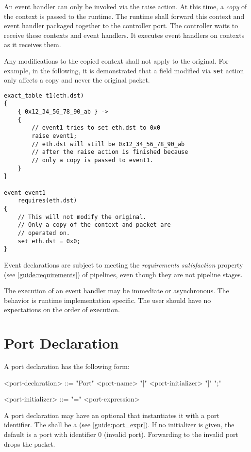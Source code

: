 An event handler can only be invoked via the raise action. At this time, a \textit{copy} of the context is passed to the runtime. The runtime shall forward this context and event handler packaged together to the controller port. The controller waits to receive these contexts and event handlers. It executes event handlers on contexts as it receives them.

Any modifications to the copied context shall not apply to the original. For example, in the following, it is demonstrated that a field modified via \texttt{set} action only affects a copy and never the original packet.

\begin{minip}
\begin{lstlisting}
exact_table t1(eth.dst)
{
	{ 0x12_34_56_78_90_ab } ->
	{
		// event1 tries to set eth.dst to 0x0
		raise event1;
		// eth.dst will still be 0x12_34_56_78_90_ab
		// after the raise action is finished because
		// only a copy is passed to event1.
	}
}

event event1
	requires(eth.dst)
{
	// This will not modify the original.
	// Only a copy of the context and packet are
	// operated on.
	set eth.dst = 0x0;
}
\end{lstlisting}
\end{minip}

Event declarations are subject to meeting the \textit{requirements satisfaction} property (see \ref{guide:requirements}) of pipelines, even though they are not pipeline stages.

The execution of an event handler may be immediate or asynchronous. The behavior is runtime implementation specific. The user should have no expectations on the order of execution. 

\section{Port Declaration} \label{guide:port}

A port declaration has the following form:

\begin{minip}
\begin{grammar}
<port-declaration> ::=
"Port" <port-name> "[" <port-initializer> "]" ";"

<port-initializer> ::= "=" <port-expression>
\end{grammar}
\end{minip}

A port declaration may have an optional  that instantiates it with a port identifier. The  shall be a  (see \ref{guide:port_expr}). If no initializer is given, the default is a port with identifier 0 (invalid port). Forwarding to the invalid port drops the packet.

